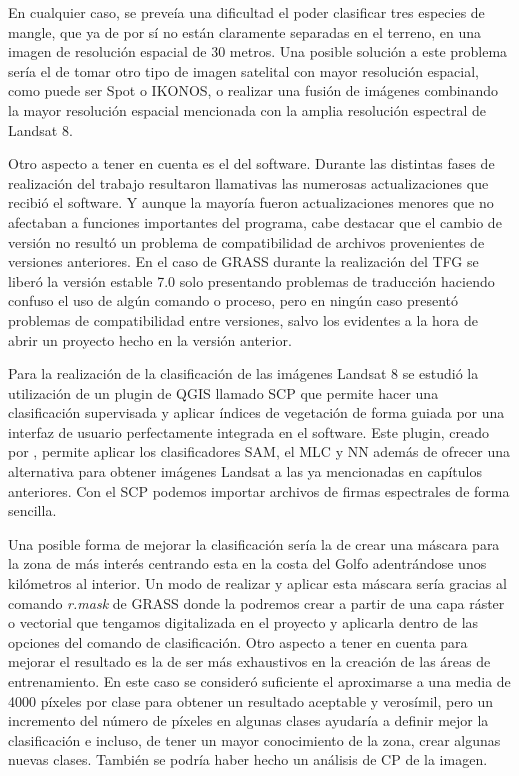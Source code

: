 En cualquier caso, se preveía una dificultad el poder clasificar tres especies de mangle, que ya de por sí no están claramente separadas en el terreno, en una imagen de resolución espacial de 30 metros. Una posible solución a este problema sería el de tomar otro tipo de imagen satelital con mayor resolución espacial, como puede ser Spot o IKONOS, o realizar una fusión de imágenes combinando la mayor resolución espacial mencionada con la amplia resolución espectral de Landsat 8.%

Otro aspecto a tener en cuenta es el del software. Durante las distintas fases de realización del trabajo resultaron llamativas las numerosas actualizaciones que recibió el software. Y aunque la mayoría fueron actualizaciones menores que no afectaban a funciones importantes del programa, cabe destacar que el cambio de versión no resultó un problema de compatibilidad de archivos provenientes de versiones anteriores. En el caso de GRASS durante la realización del \ac{TFG} se liberó la versión estable 7.0 solo presentando problemas de traducción haciendo confuso el uso de algún comando o proceso, pero en ningún caso presentó problemas de compatibilidad entre versiones, salvo los evidentes a la hora de abrir un proyecto hecho en la versión anterior.%

Para la realización de la clasificación de las imágenes Landsat 8 se estudió la utilización de un plugin de QGIS llamado \ac{SCP} que permite hacer una clasificación supervisada y aplicar índices de vegetación de forma guiada por una interfaz de usuario perfectamente integrada en el software. Este plugin, creado por \cite{Congedo2015}, permite aplicar los clasificadores \ac{SAM}, el \ac{MLC} y \ac{NN} además de ofrecer una alternativa para obtener imágenes Landsat a las ya mencionadas en capítulos anteriores. Con el \ac{SCP} podemos importar archivos de firmas espectrales de forma sencilla.%

Una posible forma de mejorar la clasificación sería la de crear una máscara para la zona de más interés centrando esta en la costa del Golfo adentrándose unos kilómetros al interior. Un modo de realizar y aplicar esta máscara sería gracias al comando \textit{r.mask} de GRASS donde la podremos crear a partir de una capa ráster o vectorial que tengamos digitalizada en el proyecto y aplicarla dentro de las opciones del comando de clasificación. Otro aspecto a tener en cuenta para mejorar el resultado es la de ser más exhaustivos en la creación de las áreas de entrenamiento. En este caso se consideró suficiente el aproximarse a una media de 4000 píxeles por clase para obtener un resultado aceptable y verosímil, pero un incremento del número de píxeles en algunas clases ayudaría a definir mejor la clasificación e incluso, de tener un mayor conocimiento de la zona, crear algunas nuevas clases. También se podría haber hecho un análisis de \ac{CP} de la imagen.%

